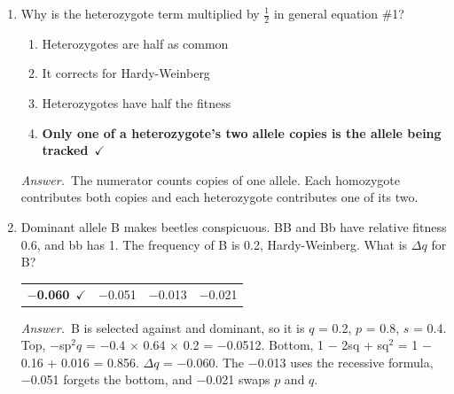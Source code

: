 \documentclass[11pt]{article}
\newcommand{\keyans}[1]{\par\medskip\noindent\textit{Answer.}\ #1\par\medskip}
\begin{document}
\begin{enumerate}[label=\textbf{\arabic*.}, leftmargin=2em, itemsep=1.4em]
\keyans{Drift is random sampling of gametes. Smaller populations sample fewer gametes, so chance moves their frequencies further, giving a wider spread.}
\item Why is the heterozygote term multiplied by \(\tfrac{1}{2}\) in general equation \#1?
\nopagebreak\par{}
\par\smallskip
\begin{enumerate}[label={}, leftmargin=2.4em, labelwidth=0pt, itemsep=2pt, topsep=0pt]
\item \hspace*{-2.4em}Heterozygotes are half as common
\item \hspace*{-2.4em}It corrects for Hardy-Weinberg
\item \hspace*{-2.4em}Heterozygotes have half the fitness
\item \hspace*{-2.4em}\textbf{Only one of a heterozygote's two allele copies is the allele being tracked}\ \(\checkmark\)
\end{enumerate}
\keyans{The numerator counts copies of one allele. Each homozygote contributes both copies and each heterozygote contributes one of its two.}
\item Dominant allele B makes beetles conspicuous. BB and Bb have relative fitness 0.6, and bb has 1. The frequency of B is 0.2, Hardy-Weinberg. What is \(\Delta q\) for B?
\nopagebreak\par{}
\par\smallskip\noindent\begin{tabularx}{\linewidth}{@{}YYYY@{}}
\textbf{\(-\)0.060}\ \(\checkmark\) & \(-\)0.051 & \(-\)0.013 & \(-\)0.021 \\
\end{tabularx}
\keyans{B is selected against and dominant, so it is \(q\) = 0.2, \(p\) = 0.8, \(s\) = 0.4. Top, \(-\)sp\(^2 q\) = \(-\)0.4 \(\times\) 0.64 \(\times\) 0.2 = \(-\)0.0512. Bottom, 1 \(-\) 2sq + sq\(^2\) = 1 \(-\) 0.16 + 0.016 = 0.856. \(\Delta q\) = \(-\)0.060. The \(-\)0.013 uses the recessive formula, \(-\)0.051 forgets the bottom, and \(-\)0.021 swaps \(p\) and \(q\).}

\end{enumerate}
\end{document}
